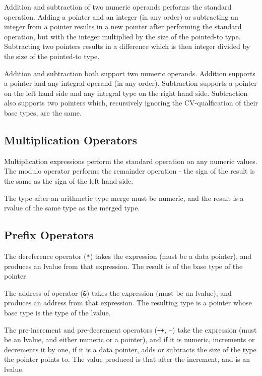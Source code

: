 \documentclass[letterpaper,12pt]{book}
\begin{document}


Addition and subtraction of two numeric operands performs the standard operation. Adding a pointer and an integer (in any order) or subtracting an integer from a pointer results in a new pointer after performing the standard operation, but with the integer multiplied by the size of the pointed-to type. Subtracting two pointers results in a difference which is then integer divided by the size of the pointed-to type.

Addition and subtraction both support two numeric operands. Addition supports a pointer and any integral operand (in any order). Subtraction supports a pointer on the left hand side and any integral type on the right hand side. Subtraction also supports two pointers which, recursively ignoring the CV-qualfication of their base types, are the same.

\subsection{Multiplication Operators}



Multiplication expressions perform the standard operation on any numeric values. The modulo operator performs the remainder operation - the sign of the result is the same as the sign of the left hand side.

The type after an arithmetic type merge must be numeric, and the result is a rvalue of the same type as the merged type.

\subsection{Prefix Operators}



The dereference operator (\texttt{*}) takes the expression (must be a data pointer), and produces an lvalue from that expression. The result is of the base type of the pointer.

The address-of operator (\texttt{\&}) takes the expression (must be an lvalue), and produces an address from that expression. The resulting type is a pointer whose base type is the type of the lvalue.

The pre-increment and pre-decrement operators (\texttt{++}, \texttt{--}) take the expression (must be an lvalue, and either numeric or a pointer), and if it is numeric, increments or decrements it by one, if it is a data pointer, adds or subtracts the size of the type the pointer points to. The value produced is that after the increment, and is an lvalue.
\end{document}
